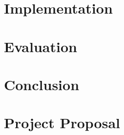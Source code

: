 \documentclass[12pt,a4paper,twoside,openany]{report}
\begin{document}
    \chapter{Implementation}\label{ch:implementation}
    


    \chapter{Evaluation}\label{ch:evaluation}
    


    \chapter{Conclusion}\label{ch:conclusion}
    

%    


    \printbibliography[heading=bibintoc]

    \appendix

    

    \chapter{Project Proposal}\label{ch:proposal}
    

\end{document}
